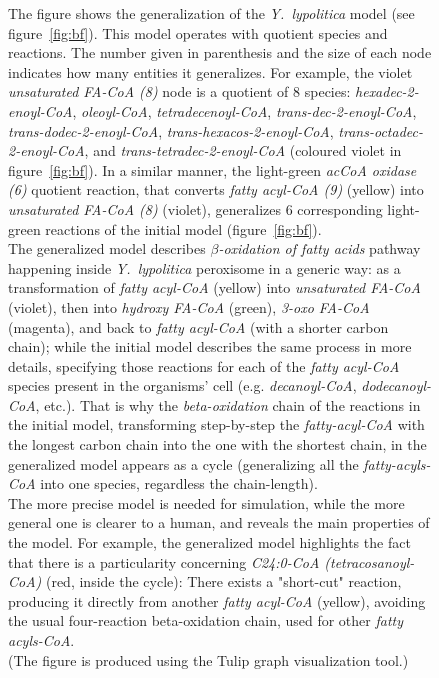 \documentclass[9pt]{article}
\newcounter{fig}
\newcounter{rm}
\begin{document}
\begin{figure}
\captionsetup{labelformat=adja-page}
\ContinuedFloat
    \caption{The figure shows the generalization of the \textit{Y.~lypolitica} model (see figure~\ref{fig:bf}). This model operates with quotient species and reactions. The number given in parenthesis and the size of each node indicates how many entities it generalizes. For example, the violet \textit{unsaturated FA-CoA (8)} node is a quotient of 8 species: \textit{hexadec-2-enoyl-CoA}, \textit{oleoyl-CoA}, \textit{tetradecenoyl-CoA}, \textit{trans-dec-2-enoyl-CoA}, \textit{trans-dodec-2-enoyl-CoA}, \textit{trans-hexacos-2-enoyl-CoA}, \textit{trans-octadec-2-enoyl-CoA}, and \textit{trans-tetradec-2-enoyl-CoA} (coloured violet in figure~\ref{fig:bf}). In a similar manner, the light-green \textit{acCoA oxidase (6)} quotient reaction, that converts \textit{fatty acyl-CoA (9)} (yellow) into \textit{unsaturated FA-CoA (8)} (violet), generalizes 6 corresponding light-green reactions of the initial model (figure~\ref{fig:bf}).\\
            The generalized model describes \textit{$\beta$-oxidation of fatty acids} pathway~\citep{Metzler01} happening inside \textit{Y.~lypolitica} peroxisome in a generic way: as a transformation of \textit{fatty acyl-CoA} (yellow) into \textit{unsaturated FA-CoA} (violet), then into \textit{hydroxy FA-CoA} (green), \textit{3-oxo FA-CoA} (magenta), and back to \textit{fatty acyl-CoA} (with a shorter carbon chain); while the initial model describes the same process in more details, specifying those reactions for each of the \textit{fatty acyl-CoA} species present in the organisms' cell (e.g. \textit{decanoyl-CoA}, \textit{dodecanoyl-CoA}, etc.). That is why the \textit{beta-oxidation} chain of the reactions in the initial model, transforming step-by-step the \emph{fatty-acyl-CoA} with the longest carbon chain into the one with the shortest chain, in the generalized model appears as a cycle (generalizing all the \textit{fatty-acyls-CoA} into one species, regardless the chain-length).\\   
               The more precise model is needed for simulation, while the more general one is clearer to a human, and reveals the main properties of the model. For example, the generalized model highlights the fact that there is a particularity concerning \textit{C24:0-CoA (tetracosanoyl-CoA)} (red, inside the cycle): There exists a "short-cut" reaction, producing it directly from another \textit{fatty acyl-CoA} (yellow), avoiding the usual four-reaction beta-oxidation chain, used for other \textit{fatty acyls-CoA}.\\     
            (The figure is produced using the Tulip graph visualization tool.)}
\label{fig:yali}
\end{figure}
\end{document}
